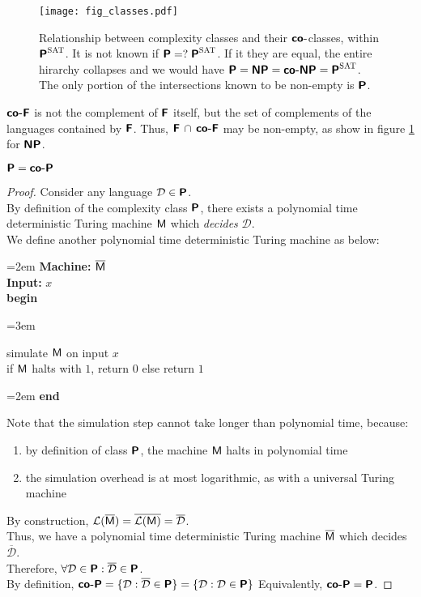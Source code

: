 \documentclass[usletter]{article}
\newcommand{\collection}[1]
           {\ensuremath{\mathcal{#1}}}
\newcommand{\namedcollection}[1]
           {\ensuremath{\textnormal{\textsc{#1}}}}
\newcommand{\machine}[1]
           {\ensuremath{\textnormal{\textsf{#1}}}}
\newcommand{\family}[1]
           {\ensuremath{\textnormal{\textsf{\textbf{#1}}}}}
\newenvironment{turing}[2]{
  \par\smallskip\leftskip=2em
  \noindent\ignorespaces
  \textbf{Machine:} #1\\
  \textbf{Input:} #2\\[5pt]
  \textbf{begin}
  \par\leftskip=3em
  \noindent\ignorespaces
}{
  \par\leftskip=2em
  \noindent\ignorespaces
  \textbf{end}
  \par\medskip
}
\begin{document}
\begin{figure}[h]
\centering
\graphicspath{{include/fig_classes/}}
\texttt{[image: fig\_classes.pdf]}
\caption{Relationship between complexity classes and their \family{co-}classes, within $\family{P}^\namedcollection{SAT}$. It is not known if $\family{P} =?\; \family{P}^\namedcollection{SAT}$. If it they are equal, the entire hirarchy collapses and we would have $\family{P} = \family{NP} = \family{co-NP} = \family{P}^\namedcollection{SAT}$. The only portion of the intersections known to be non-empty is \family{P}.}
\label{classes_fig}
\end{figure}

\begin{remark}
\family{co-F} is not the complement of \family{F} itself, but the set of complements of the languages contained by \family{F}. Thus, $\family{F} \,\cap\, \family{co-F}$ may be non-empty, as show in figure \ref{classes_fig} for \family{NP}.
\end{remark}

\begin{proposition}
$\family{P} = \family{co-P}$
\end{proposition}

\begin{proof}
Consider any language $\collection{D} \in \family{P}$. \\
By definition of the complexity class \family{P}, there exists a polynomial time deterministic Turing machine \machine{M} which \textit{decides} \collection{D}. \\

\noindent
We define another polynomial time deterministic Turing machine as below:
\begin{turing}{$\overline{\machine{M}}$}{$x$}
  simulate \machine{M} on input $x$ \\
  if \machine{M} halts with $1$, return $0$ else return $1$
\end{turing}

\noindent
Note that the simulation step cannot take longer than polynomial time, because:
\begin{enumerate}
  \item by definition of class \family{P}, the machine \machine{M} halts in polynomial time
  \item the simulation overhead is at most logarithmic, as with a universal Turing machine
\end{enumerate}

\noindent
By construction, $\collection{L}(\overline{\machine{M}}) = \overline{\collection{L}(\machine{M})} = \overline{\collection{D}}$. \\
Thus, we have a polynomial time deterministic Turing machine $\overline{\machine{M}}$ which decides $\overline{\collection{D}}$. \\

\noindent
Therefore, $\forall \collection{D} \in \family{P} : \overline{\collection{D}} \in \family{P}$. \\
By definition, $\family{co-P} = \{\collection{D} : \overline{\collection{D}} \in \family{P} \} = \{\collection{D} : \collection{D} \in \family{P} \}$ Equivalently, $\family{co-P} = \family{P}$.
\end{proof}
\end{document}
